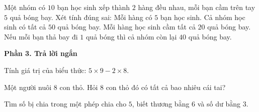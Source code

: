 \begin{ex} %
Một nhóm có $10$ bạn học sinh xếp thành $2$ hàng đều nhau, mỗi bạn cầm trên tay $5$ quả bóng bay. Xét tính đúng sai:
\choiceTF
{\True Mỗi hàng có $5$ bạn học sinh.}
{\True Cả nhóm học sinh có tất cả $50$ quả bóng bay.}
{Mỗi hàng học sinh cầm tất cả $20$ quả bóng bay.}
{\True Nếu mỗi bạn thả bay đi $1$ quả bóng thì cả nhóm còn lại $40$ quả bóng bay.}
\end{ex}

\textbf{Phần 3. Trả lời ngắn}

\begin{ex} %
Tính giá trị của biểu thức: $5 \times 9 - 2 \times 8$.
\end{ex}

\begin{ex} %
Một người nuôi $8$ con thỏ. Hỏi $8$ con thỏ đó có tất cả bao nhiêu cái tai?
\end{ex}

\begin{ex} %
Tìm số bị chia trong một phép chia cho $5$, biết thương bằng $6$ và số dư bằng $3$.
\end{ex}

